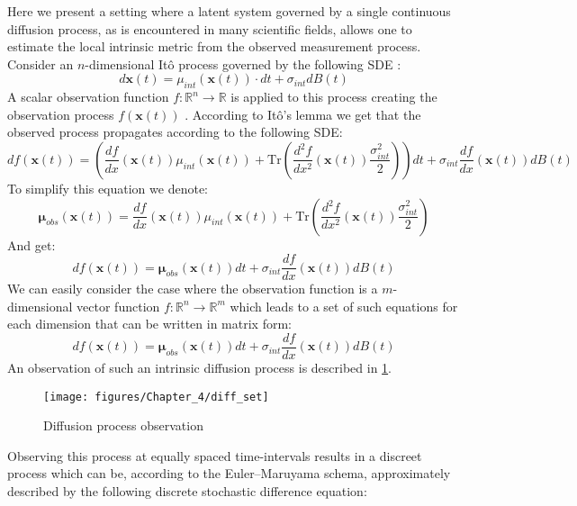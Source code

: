Here we present a setting where a latent system governed by a single continuous diffusion process, as is encountered in many scientific fields, allows one to estimate the local intrinsic metric from the observed measurement process. Consider an $n$-dimensional Itô process governed by the following \ac{SDE} :
\[
d\mathbf{x}\left(t\right)=\mu_{int}\left(\mathbf{x}\left(t\right)\right)\cdot dt+\sigma_{int}dB\left(t\right)
\]
A scalar observation function $f:\mathbb{R}^{n}\to\mathbb{R}$ is
applied to this process creating the observation process $f\left(\mathbf{x}\left(t\right)\right)$
. According to Itô's lemma \cite{karatzas2012brownian} we get that
the observed process propagates according to the following \ac{SDE}:
\[
df\left(\mathbf{x}\left(t\right)\right)=\left(\frac{df}{dx}\left(\mathbf{x}\left(t\right)\right)\mu_{int}\left(\mathbf{x}\left(t\right)\right)+\text{Tr}\left(\frac{d^{2}f}{dx^{2}}\left(\mathbf{x}\left(t\right)\right)\frac{\sigma_{int}^{2}}{2}\right)\right)dt+\sigma_{int}\frac{df}{dx}\left(\mathbf{x}\left(t\right)\right)dB\left(t\right)
\]
To simplify this equation we denote:
\[
\mathbf{\mu}_{obs}\left(\mathbf{x}\left(t\right)\right)=\frac{df}{dx}\left(\mathbf{x}\left(t\right)\right)\mu_{int}\left(\mathbf{x}\left(t\right)\right)+\text{Tr}\left(\frac{d^{2}f}{dx^{2}}\left(\mathbf{x}\left(t\right)\right)\frac{\sigma_{int}^{2}}{2}\right)
\]
And get:
\[
df\left(\mathbf{x}\left(t\right)\right)=\mathbf{\mu}_{obs}\left(\mathbf{x}\left(t\right)\right)dt+\sigma_{int}\frac{df}{dx}\left(\mathbf{x}\left(t\right)\right)dB\left(t\right)
\]
We can easily consider the case where the observation function is a $m$-dimensional vector function $f:\mathbb{R}^{n}\to\mathbb{R}^{m}$ which leads to a set of such equations for each dimension that can be written in matrix form:
\[
df\left(\mathbf{x}\left(t\right)\right)=\mathbf{\mu}_{obs}\left(\mathbf{x}\left(t\right)\right)dt+\sigma_{int}\frac{df}{dx}\left(\mathbf{x}\left(t\right)\right)dB\left(t\right)
\]
An observation of such an intrinsic diffusion process is described in \cref{fig:Diffusion-process-observation}.
\begin{figure}[h]
	\centering{}\texttt{[image: figures/Chapter\_4/diff\_set]}\caption{Diffusion process observation\label{fig:Diffusion-process-observation}}
\end{figure}
Observing this process at equally spaced time-intervals results in a discreet process which can be, according to the Euler–Maruyama schema\cite{kloeden1992numerical}, approximately described by the following discrete stochastic difference equation: 

